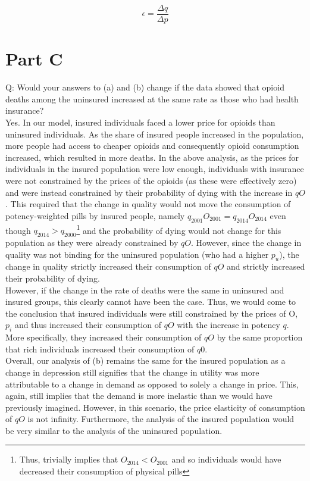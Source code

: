 \documentclass{article}
\begin{document}
$$\epsilon = \frac{\Delta q}{\Delta p} $$

\section*{Part C}
Q: Would your answers to (a) and (b) change if the data showed that opioid deaths among the uninsured increased at the same rate as those who had health insurance?\\

Yes. In our model, insured individuals faced a lower price for opioids than uninsured individuals. As the share of insured people increased in the population, more people had access to cheaper opioids and consequently opioid consumption increased, which resulted in more deaths. In the above analysis, as the prices for individuals in the insured population were low enough, individuals with insurance were not constrained by the prices of the opioids (as these were effectively zero) and were instead constrained by their probability of dying with the increase in $qO$. This required that the change in quality would not move the consumption of potency-weighted pills by insured people, namely $q_{2001}O_{2001} = q_{2014}O_{2014}$ even though $q_{2014}>q_{2000}$\footnote{Thus, trivially implies that $O_{2014}<O_{2001}$ and so individuals would have decreased their consumption of physical pills} and the probability of dying would not change for this population as they were already constrained by $qO$. However, since the change in quality was not binding for the uninsured population (who had a higher $p_u$), the change in quality strictly increased their consumption of $qO$ and strictly increased their probability of dying.\\

However, if the change in the rate of deaths were the same in uninsured and insured groups, this clearly cannot have been the case. Thus, we would come to the conclusion that insured individuals were still constrained by the prices of O, $p_i$ and thus increased their consumption of $qO$ with the increase in potency $q$. More specifically, they increased their consumption of $qO$ by the same proportion that rich individuals increased their consumption of $q0$.\\

Overall, our analysis of (b) remains the same for the insured population as a change in depression still signifies that the change in utility was more attributable to a change in demand as opposed to solely a change in price. This, again, still implies that the demand is more inelastic than we would have previously imagined. However, in this scenario, the price elasticity of consumption of $qO$ is not infinity. Furthermore, the analysis of the insured population would be very similar to the  analysis of the uninsured population.
\end{document}
